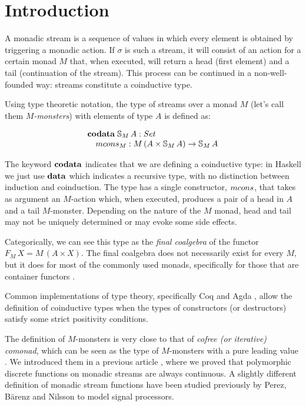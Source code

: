 \section{Introduction}

A monadic stream is a sequence of values in which every element is obtained by triggering a monadic action.
If $\sigma$ is such a stream, it will consist of an action for a certain monad $M$ that, when executed, will return a head (first element) and a tail (continuation of the stream).
This process can be continued in a non-well-founded way: streams constitute a coinductive type.

Using type theoretic notation, the type of streams over a monad $M$ (let's call them {\em $M$-monsters}) with elements of type $A$ is defined as:

$$
\begin{array}[t]{l}
\codata\;
\stream{M}\,A:\set\\
\quad \mcons_M: M\,(A\times \stream{M}\,A)\rightarrow\stream{M}\,A
\end{array}
$$

The keyword $\mathbf{codata}$ indicates that we are defining a coinductive type: in Haskell we just use $\mathbf{data}$ which indicates a recursive type, with no distinction between induction and coinduction. 
The type has a single constructor, $\mcons$, that takes as argument an $M$-action which, when executed, produces a pair of a head in $A$ and a tail $M$-monster.
Depending on the nature of the $M$ monad, head and tail may not be uniquely determined or may evoke some side effects.

Categorically, we can see this type as the {\em final coalgebra} of the functor $F_M\,X = M\,(A\times X)$.
The final coalgebra does not necessarily exist for every $M$, 
but it does for most of the commonly used monads, specifically for those that are container functors \cite{AAG:2005}.

Common implementations of type theory, specifically Coq \cite{coq} and Agda \cite{agda}, allow the definition of coinductive types when the types of constructors (or destructors) satisfy some strict positivity conditions.

The definition of $M$-monsters is very close to that of {\em cofree (or iterative) comonad}, which can be seen as the type of $M$-monsters with a pure 
leading value \cite{AAMV:2003,CUV:2006}.
We introduced them in a previous article \cite{capretta/fowler:2017}, where we proved that polymorphic discrete functions on monadic streams are always continuous.
A slightly different definition of monadic stream functions have been studied previously by Perez, B{\"{a}}renz and Nilsson \cite{PBN:2016} to model signal processors.

